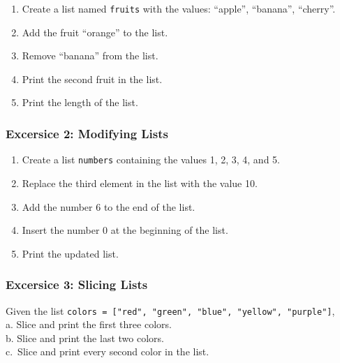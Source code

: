 \documentclass[
  letterpaper,
  DIV=11,
  numbers=noendperiod]{scrreprt}
\providecommand{\tightlist}{%
  \setlength{\itemsep}{0pt}\setlength{\parskip}{0pt}}\usepackage{longtable,booktabs,array}
\begin{document}
\begin{enumerate}
\def\labelenumi{\alph{enumi}.}
\tightlist
\item
  Create a list named \texttt{fruits} with the values: ``apple'',
  ``banana'', ``cherry''.\\
\item
  Add the fruit ``orange'' to the list.\\
\item
  Remove ``banana'' from the list.\\
\item
  Print the second fruit in the list.\\
\item
  Print the length of the list.
\end{enumerate}

\hypertarget{excersice-2-modifying-lists}{%
\subsubsection{Excersice 2: Modifying
Lists}\label{excersice-2-modifying-lists}}

\begin{enumerate}
\def\labelenumi{\alph{enumi}.}
\tightlist
\item
  Create a list \texttt{numbers} containing the values 1, 2, 3, 4, and
  5.\\
\item
  Replace the third element in the list with the value 10.\\
\item
  Add the number 6 to the end of the list.\\
\item
  Insert the number 0 at the beginning of the list.\\
\item
  Print the updated list.
\end{enumerate}

\hypertarget{excersice-3-slicing-lists}{%
\subsubsection{Excersice 3: Slicing
Lists}\label{excersice-3-slicing-lists}}

Given the list
\texttt{colors\ =\ {[}"red",\ "green",\ "blue",\ "yellow",\ "purple"{]}},\\
a. Slice and print the first three colors.\\
b. Slice and print the last two colors.\\
c.~Slice and print every second color in the list.
\end{document}
